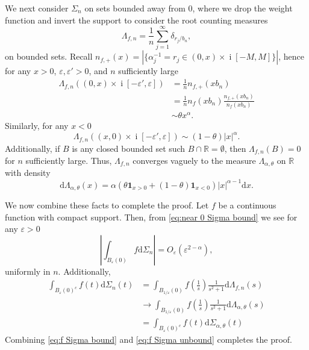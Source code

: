 \documentclass[reqno]{amsart}
\newcommand{\oindicator}[1]{\ensuremath{\mathbf{1}_{{#1}}}}
\newcommand{\1}{\mathbf{1}}
\newcommand{\dd}{\mathrm{d}}
\DeclareMathOperator{\ii}{i}
\newcommand{\eps}{\varepsilon}
\newcommand{\R}{\mathbb{R}}
\def\R{\mathbb{R}}
\theoremstyle{plain}
\theoremstyle{definition}
\theoremstyle{remark}
\numberwithin{equation}{section}
\begin{document}
	 	We next consider $\Sigma_n$ on sets bounded away from $0$, where we drop the weight function and invert the support to consider the root counting measures\begin{equation}
	 			\Lambda_{f,n}=\frac{1}{n}\sum_{j=1}^{\infty}\delta_{r_{j}/b_n},
	 		\end{equation} on bounded sets. Recall $n_{f,+}(x)= |\{\alpha_{j}^{-1}=r_j \in (0,x)\times\ii[-M,M]\}|$, hence for any $x>0$, $\eps,\eps'>0$, and $n$ sufficiently large \begin{equation}
	 			\begin{aligned}
	 					\Lambda_{f,n}\left((0,x)\times\ii[-\eps',\eps]\right)&=\frac{1}{n}n_{f,+}\left(x{b_n}\right)\\
	 					&=\frac{1}{n}n_{f}\left(xb_n\right)\frac{n_{f,+}\left(xb_n\right)}{n_{f}\left(x{b_n}\right)}\\
	 					&\sim \theta x^{\alpha}.
	 				\end{aligned}
	 		\end{equation}  Similarly, for any $x<0$ \begin{equation}
	 			\Lambda_{f,n}\left((x,0)\times\ii[-\eps',\eps]\right)\sim (1-\theta){|x|^{\alpha}}.
	 		\end{equation}  Additionally, if $B$ is any closed bounded set such $B\cap\R=\emptyset$, then $\Lambda_{f,n}(B)=0$ for $n$ sufficiently large. Thus, $\Lambda_{f,n}$ converges vaguely to the measure $\Lambda_{\alpha,\theta}$ on $\R$ with density $$\dd \Lambda_{\alpha,\theta}(x)=\alpha\left(\theta\oindicator{x>0}+(1-\theta)\oindicator{x<0}\right)|x|^{\alpha-1}\dd x.$$ 
	 		
	 		We now combine these facts to complete the proof. Let $f$ be a continuous function with compact support. Then, from \eqref{eq:near 0 Sigma bound} we see for any $\eps>0$ \begin{equation}\label{eq:f Sigma bound}
	 			\left|\int_{B_{\eps}(0)}f\dd\Sigma_{n} \right|=O_{\eps}(\eps^{2-\alpha}),
	 		\end{equation} uniformly in $n$. Additionally, \begin{equation}\label{eq:f Sigma unbound}
	 		\begin{aligned}
	 				\int_{B_{\eps}(0)^c}f(t)\dd\Sigma_{n}(t)&=\int_{B_{1/\eps}(0)} f\left(\frac{1}{s}\right)\frac{1}{s^2+1}\dd\Lambda_{f,n}(s)\\
	 				&\rightarrow\int_{B_{1/\eps}(0)} f\left(\frac{1}{s}\right)\frac{1}{s^2+1}\dd\Lambda_{\alpha,\theta}(s)\\
	 				&=	\int_{B_{\eps}(0)^c}f(t)\dd\Sigma_{\alpha,\theta}(t)
	 		\end{aligned}
	 		\end{equation} Combining \eqref{eq:f Sigma bound} and \eqref{eq:f Sigma unbound} completes the proof. 
	 
\end{document}
